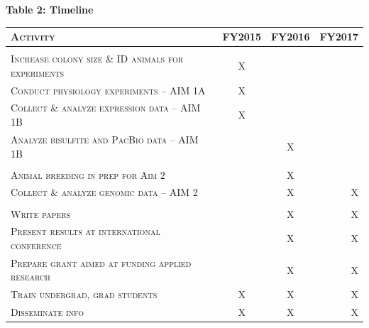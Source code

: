 \documentclass[12pt]{article}
\begin{document}
\vspace{3mm}
\textbf{Table 2: Timeline}
\hypertarget{Table 2}{}
\begin{center}
\begin{tabular}{l|c c r}

\textsc{Activity} & \textsc{FY2015} & \textsc{FY2016} & \textsc{FY2017} \\
\hline \\
\textsc{Increase colony size \& ID animals for experiments } & X & & \\
\textsc{Conduct physiology experiments -- AIM 1A} & X & & \\
\textsc{Collect \& analyze expression data -- AIM 1B} & X & & \\
\textsc{Analyze bisulfite and PacBio data -- AIM 1B} & & X & \\
\textsc{} & &  &   \\
\textsc{Animal breeding in prep for Aim 2} & & X &  \\
\textsc{Collect \& analyze genomic data -- AIM 2} & & X & X \\
\textsc{} & &  &   \\
\textsc{Write papers} & & X & X \\
\textsc{Present results at international conference} & & X & X \\
\textsc{Prepare grant aimed at funding applied research} & & X & X \\
\textsc{Train undergrad, grad students} & X & X & X \\
\textsc{Disseminate info} & X & X & X \\

\end{tabular}
\end{center}
\vspace{5mm}

\newpage
\singlespacing



\end{document}
